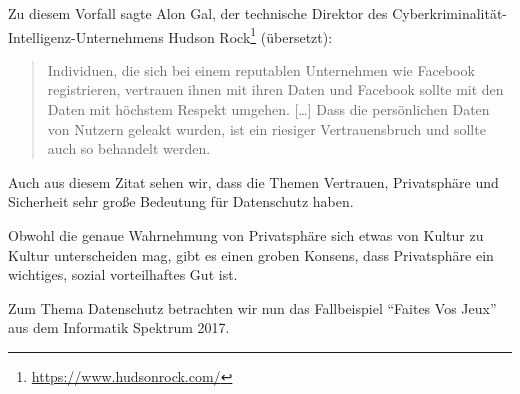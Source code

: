 Zu diesem Vorfall sagte Alon Gal, der technische Direktor des Cyberkriminalität-Intelligenz-Unternehmens Hudson Rock\footnote{\url{https://www.hudsonrock.com/}} (übersetzt):
\blockquote[\cite{holmes_533_2021}]{
    Individuen, die sich bei einem reputablen Unternehmen wie Facebook registrieren, vertrauen ihnen mit ihren Daten
    und Facebook sollte mit den Daten mit höchstem Respekt umgehen. [\dots] 
    Dass die persönlichen Daten von Nutzern geleakt wurden, ist ein riesiger Vertrauensbruch und sollte auch so behandelt werden.
}

Auch aus diesem Zitat sehen wir, dass die Themen Vertrauen, Privatsphäre und Sicherheit sehr große Bedeutung für Datenschutz haben. 

Obwohl die genaue Wahrnehmung von Privatsphäre sich etwas von Kultur zu Kultur unterscheiden mag,
gibt es einen groben Konsens, dass Privatsphäre ein wichtiges, sozial vorteilhaftes Gut ist.\cite{lee_ethical_2016}

Zum Thema Datenschutz betrachten wir nun das Fallbeispiel \enquote{Faites Vos Jeux}\cite{kees_faites_2017} aus dem Informatik Spektrum 2017.
